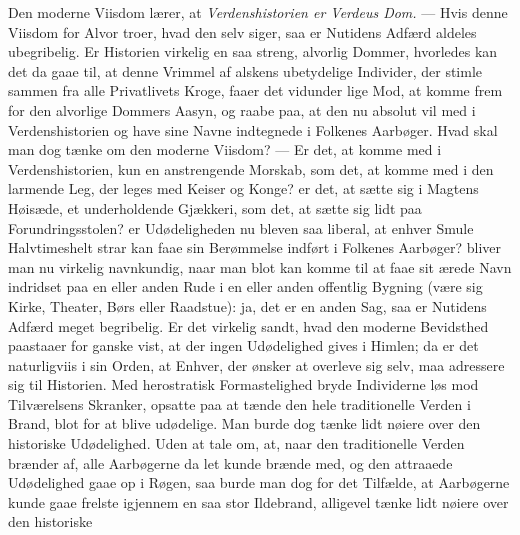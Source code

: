 \documentclass[12pt,a4paper]{book}
\begin{document}
Den moderne Viisdom lærer, at \emph{Verdenshistorien er Verdeus Dom.} --- Hvis denne
Viisdom for Alvor troer, hvad den selv siger, saa er Nutidens Adfærd aldeles ubegribelig.
Er Historien virkelig en saa streng, alvorlig Dommer, hvorledes kan det da gaae til, at
denne Vrimmel af alskens ubetydelige Individer, der stimle sammen fra alle Privatlivets
Kroge, faaer det vidunder\-%
lige Mod, at komme frem for den alvorlige Dommers Aasyn, og raabe paa, at den nu absolut
vil med i Verdenshistorien og have sine Navne indtegnede i Folkenes Aarbøger. Hvad skal
man dog tænke om den moderne Viisdom? --- Er det, at komme med i Verdenshistorien, kun
en anstrengende Morskab, som det, at komme med i den larmende Leg, der leges med Keiser
og Konge? er det, at sætte sig i Magtens Høisæde, et underholdende Gjækkeri, som det, at
sætte sig lidt paa Forundringsstolen? er Udødeligheden nu bleven saa liberal, at enhver
Smule Halvtimeshelt strar kan faae sin Berømmelse indført i Folkenes Aarbøger? bliver
man nu virkelig navnkundig, naar man blot kan komme til at faae sit ærede Navn indridset
paa en eller anden Rude i en eller anden offentlig Bygning (være sig Kirke, Theater,
Børs eller Raadstue): ja, det er en anden Sag, saa er Nutidens Adfærd meget begribelig.
Er det virkelig sandt, hvad den moderne Bevidsthed paastaaer for ganske vist, at der
ingen Udødelighed gives i Himlen; da er det naturligviis i sin Orden, at Enhver, der
ønsker at overleve sig selv, maa adressere sig til Historien. Med herostratisk
Formastelighed bryde Individerne løs mod Tilværelsens Skranker, opsatte paa at tænde den
hele traditionelle Verden i Brand, blot for at blive udødelige. Man burde dog tænke lidt
nøiere over den historiske Udødelighed. Uden at tale om, at, naar den traditionelle
Verden brænder af, alle Aarbøgerne da let kunde brænde med, og den attraaede Udødelighed
gaae op i Røgen, saa burde man dog for det Tilfælde, at Aarbøgerne kunde gaae frelste
igjennem en saa stor Ildebrand, alligevel tænke lidt nøiere over den historiske
\end{document}
